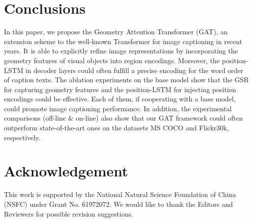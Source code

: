 \documentclass[review]{elsarticle}
\begin{document}

\section{Conclusions}
In this paper, we propose the Geometry Attention Transformer (GAT), an extension scheme to the well-known Transformer for image captioning in recent years. It is able to explicitly refine image representations by incorporating the geometry features of visual objects into region encodings. Moreover, the position-LSTM in decoder layers could often fulfill a precise encoding for the word order of caption texts. The ablation experiments on the base model show that the GSR for capturing geometry features and the position-LSTM for injecting position encodings could be effective. Each of them, if cooperating with a base model, could promote image captioning performance. In addition, the experimental comparisons (off-line $\&$ on-line) also show that our GAT framework could often outperform state-of-the-art ones on the datasets MS COCO and Flickr30k, respectively. 
 
 

\section*{Acknowledgement}
This work is supported by the National Natural Science Foundation of China (NSFC) under Grant No. 61972072. We would like to thank the Editors and Reviewers for possible revision suggestions.

\scriptsize

\end{document}
